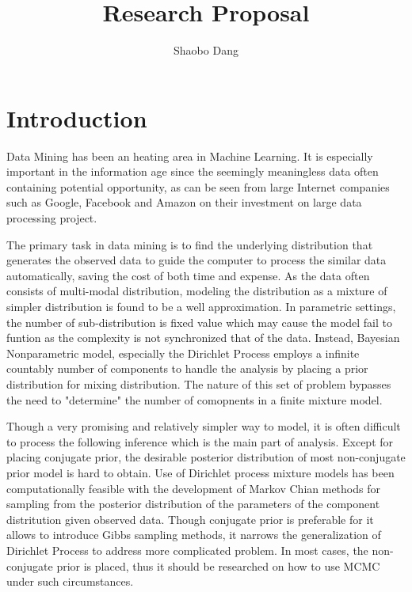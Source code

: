 \documentclass[a4paper,14pt]{article}
\title{Research Proposal}
\author{Shaobo Dang}
\date{}
\begin{document}
\maketitle
\tableofcontents

\section{Introduction}
\indent Data Mining has been an heating area in Machine Learning. It is especially important in the information age since the seemingly meaningless data often containing potential opportunity, as can be seen from large Internet companies such as Google, Facebook and Amazon \cite{mcafee2012big}on their investment on large data processing project. 

The primary task in data mining is to find the underlying distribution that generates the observed data to guide the computer to process the similar data automatically, saving the cost of both time and expense. As the data often consists of multi-modal distribution, modeling the distribution as a mixture of simpler distribution is found to be a well approximation. In parametric settings, the number of sub-distribution is fixed value which may cause the model fail to funtion as the complexity is not synchronized that of the data\cite{Antoniak1974,gershman2012tutorial,Gelman2014}. Instead, Bayesian Nonparametric model, especially the Dirichlet Process employs a infinite countably number of components to handle the analysis by placing a prior distribution for mixing distribution. The nature of this set of problem bypasses the need to "determine" the number of comopnents in a finite mixture model\cite{hjort2010bayesian}. 

Though a very promising and relatively simpler way to model, it is often difficult to process the following inference which is the main part of analysis. Except for placing conjugate prior, the desirable posterior distribution of most non-conjugate prior model is hard to obtain. Use of Dirichlet process mixture models has been computationally feasible with the development of Markov Chian methods for sampling from the posterior distribution of the parameters of the component distritution given observed data\cite{hjort2010bayesian}. Though conjugate prior is preferable for it allows to introduce Gibbs sampling methods, it narrows the generalization of Dirichlet Process\cite{Neal2000} to address more complicated problem. In most cases, the non-conjugate prior is placed, thus it should be researched on how to use MCMC under such circumstances.
\end{document}
